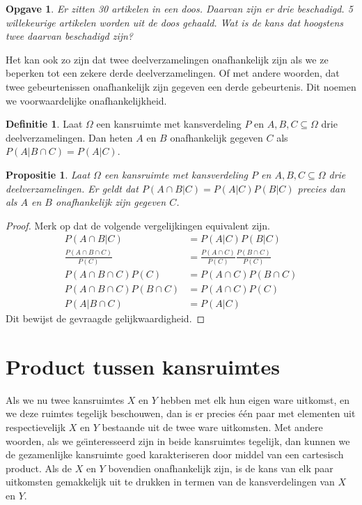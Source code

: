 \documentclass[a4paper]{book}
\newtheorem{proposition}[theorem]{Propositie}
\newtheorem{exercise}[theorem]{Opgave}
\theoremstyle{definition}
\newtheorem{definition}[theorem]{Definitie}
\begin{document}
\begin{exercise}
Er zitten 30 artikelen in een doos. Daarvan zijn er drie beschadigd.
5 willekeurige artikelen worden uit de doos gehaald. Wat is de kans dat hoogstens twee daarvan beschadigd zijn?
\end{exercise}


Het kan ook zo zijn dat twee deelverzamelingen onafhankelijk zijn als we ze beperken tot een zekere derde deelverzamelingen.
Of met andere woorden, dat twee gebeurtenissen onafhankelijk zijn gegeven een derde gebeurtenis.
Dit noemen we voorwaardelijke onafhankelijkheid.
\begin{definition}
    Laat $\Omega$ een kansruimte met kansverdeling $P$ en $A,B,C \subseteq \Omega$ drie deelverzamelingen.
    Dan heten $A$ en $B$ onafhankelijk gegeven $C$ als $P(A|B \cap C) = P(A|C)$.
\end{definition}

\begin{proposition}
    Laat $\Omega$ een kansruimte met kansverdeling $P$ en $A,B,C \subseteq \Omega$ drie deelverzamelingen.
    Er geldt dat $P(A \cap B|C) = P(A|C)P(B|C)$ precies dan als $A$ en $B$ onafhankelijk zijn gegeven $C$.
\end{proposition}
\begin{proof}
    Merk op dat de volgende vergelijkingen equivalent zijn.
    \begin{align*}
        P(A \cap B|C)                       &= P(A|C)P(B|C) \\
        \frac{P(A \cap B \cap C)}{P(C)}     &= \frac{P(A \cap C)}{P(C)} \frac{P(B \cap C)}{P(C)} \\
        P(A \cap B \cap C)P(C)              &= P(A \cap C)P(B \cap C) \\
        P(A \cap B \cap C)P(B \cap C)       &= P(A \cap C)P(C) \\
        P(A | B \cap C)                     &= P(A | C)
    \end{align*}
    Dit bewijst de gevraagde gelijkwaardigheid.
\end{proof}


\section{Product tussen kansruimtes}
Als we nu twee kansruimtes $X$ en $Y$ hebben met elk hun eigen ware uitkomst, en we deze ruimtes tegelijk beschouwen, dan is er precies \'e\'en
paar met elementen uit respectievelijk $X$ en $Y$ bestaande uit de twee ware uitkomsten.
Met andere woorden, als we ge\"{\i}nteresseerd zijn in beide kansruimtes tegelijk, dan kunnen we de gezamenlijke kansruimte goed karakteriseren
door middel van een cartesisch product.
Als de $X$ en $Y$ bovendien onafhankelijk zijn, is de kans van elk paar uitkomsten gemakkelijk uit te drukken in termen van de kansverdelingen van $X$
en $Y$.
\end{document}
